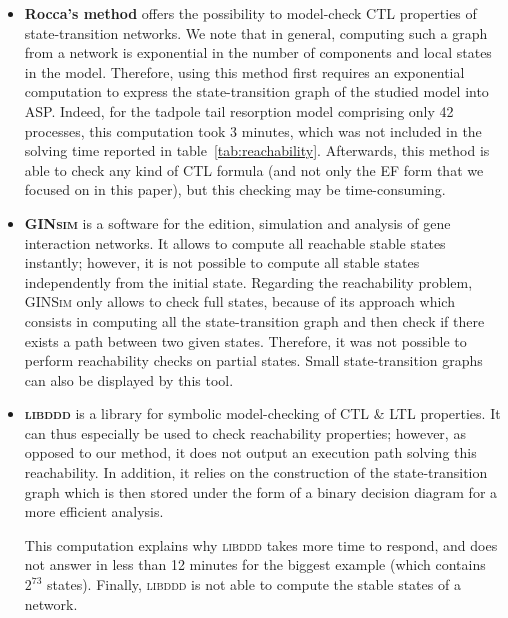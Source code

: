 \begin{itemize}

\item \textbf{Rocca's method} offers the possibility to model-check CTL properties
of state-transition networks.
We note that in general, computing such a graph from a network is exponential in the number of components and local states in the model.
Therefore, using this method first requires an exponential computation to
express the state-transition graph of the studied model into ASP.
Indeed, for the tadpole tail resorption model comprising only 42 processes,
this computation took 3 minutes, which was not included in the solving time
reported in table~\ref{tab:reachability}.
Afterwards, this method is able to check any kind of CTL formula
(and not only the EF form that we focused on in this paper),
but this checking may be time-consuming.

\item \textbf{\textsc{GINsim}} is a software for the edition, simulation and analysis
of gene interaction networks.
It allows to compute all reachable stable states instantly;
however, it is not possible to compute all stable states independently from the initial state.
Regarding the reachability problem, \textsc{GINSim} only allows to check
full states, because of its approach which consists in computing
all the state-transition graph and then check if there exists a path between two given states.
Therefore, it was not possible to perform reachability checks on partial states.
Small state-transition graphs can also be displayed by this tool.

\item \textbf{\textsc{libddd}}
is a library for symbolic model-checking of CTL \& LTL properties.
It can thus especially be used to check reachability properties;
however, as opposed to our method, it does not output an execution path
solving this reachability.
In addition, it relies on the construction of the state-transition graph
which is then stored under the form of a binary decision diagram for a more efficient analysis.

This computation explains why \textsc{libddd} takes more time to respond,
and does not answer in less than 12 minutes for the biggest example
(which contains $2^{73}$ states).
Finally, \textsc{libddd} is not able to compute the stable states of a network.


\end{itemize}
